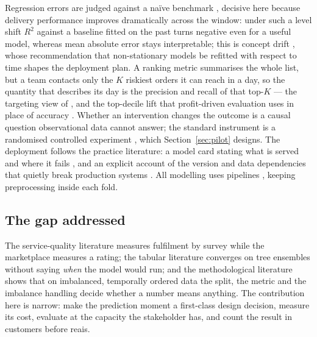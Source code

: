 Regression errors are judged against a na\"ive benchmark
\citep{hyndman2006accuracy}, decisive here because delivery performance improves
dramatically across the window: under such a level shift $R^2$ against a
baseline fitted on the past turns negative even for a useful model, whereas mean
absolute error stays interpretable; this is concept drift \citep{gama2014drift},
whose recommendation that non-stationary models be refitted with respect to
time shapes the deployment plan. A ranking metric summarises the whole list,
but a team contacts only the $K$ riskiest orders it can reach in a day, so the
quantity that describes its day is the precision and recall of that top-$K$ ---
the targeting view of \citet{provost2013data}, and the top-decile lift that
profit-driven evaluation uses in place of accuracy \citep{verbeke2012churn,
lessmann2015benchmarking}. Whether an intervention changes the outcome is a
causal question observational data cannot answer; the standard instrument is a
randomised controlled experiment \citep{kohavi2009controlled}, which
Section~\ref{sec:pilot} designs. The deployment follows the practice
literature: a model card stating what is served and where it fails
\citep{mitchell2019modelcards}, and an explicit account of the version and data
dependencies that quietly break production systems \citep{sculley2015debt}.
All modelling uses  pipelines \citep{pedregosa2011sklearn},
keeping preprocessing inside each fold.

\subsection{The gap addressed}

The service-quality literature measures fulfilment by survey while the
marketplace measures a rating; the tabular literature converges on tree
ensembles without saying \emph{when} the model would run; and the methodological
literature shows that on imbalanced, temporally ordered data the split, the
metric and the imbalance handling decide whether a number means anything. The
contribution here is narrow: make the prediction moment a first-class design
decision, measure its cost, evaluate at the capacity the stakeholder has, and
count the result in customers before reais.
